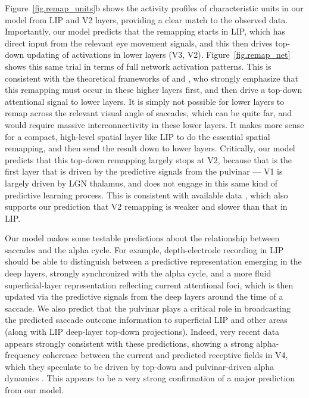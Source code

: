 \documentclass[11pt,twoside]{article}
\newif\myifpdf
\begin{document}
Figure~\ref{fig.remap_units}b shows the activity profiles of characteristic units in our model from LIP and V2 layers, providing a clear match to the observed data.  Importantly, our model predicts that the remapping starts in LIP, which has direct input from the relevant eye movement signals, and this then drives top-down updating of activations in lower layers (V3, V2).  Figure~\ref{fig.remap_net} shows this same trial in terms of full network activation patterns.  This is consistent with the theoretical frameworks of  and , who strongly emphasize that this remapping must occur in these higher layers first, and then drive a top-down attentional signal to lower layers.  It is simply not possible for lower layers to remap across the relevant visual angle of saccades, which can be quite far, and would require massive interconnectivity in these lower layers.  It makes more sense for a compact, high-level spatial layer like LIP to do the essential spatial remapping, and then send the result down to lower layers.  Critically, our model predicts that this top-down remapping largely stops at V2, because that is the first layer that is driven by the predictive signals from the pulvinar --- V1 is largely driven by LGN thalamus, and does not engage in this same kind of predictive learning process.  This is consistent with available data \cite{NakamuraColby02}, which also supports our prediction that V2 remapping is weaker and slower than that in LIP.

Our model makes some testable predictions about the relationship between saccades and the alpha cycle.  For example, depth-electrode recording in LIP should be able to distinguish between a predictive representation emerging in the deep layers, strongly synchronized with the alpha cycle, and a more fluid superficial-layer representation reflecting current attentional foci, which is then updated via the predictive signals from the deep layers around the time of a saccade.  We also predict that the pulvinar plays a critical role in broadcasting the predicted saccade outcome information to superficial LIP and other areas (along with LIP deep-layer top-down projections).  Indeed, very recent data appears strongly consistent with these predictions, showing a strong alpha-frequency coherence between the current and predicted receptive fields in V4, which they speculate to be driven by top-down and pulvinar-driven alpha dynamics \cite{NeupaneGuittonPack2017}.  This appears to be a very strong confirmation of a major prediction from our model.
\end{document}
